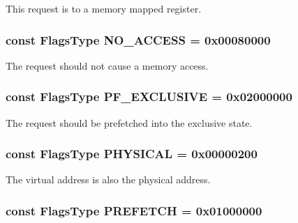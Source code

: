 \label{classRequest_a49ba1ff56158133aba02dce7a13952cb}
This request is to a memory mapped register. \hypertarget{classRequest_ab305c2952b5ae966870f325f2bef006c}{
\subsubsection[{NO\_\-ACCESS}]{\setlength{\rightskip}{0pt plus 5cm}const {\bf FlagsType} {\bf NO\_\-ACCESS} = 0x00080000}}
\label{classRequest_ab305c2952b5ae966870f325f2bef006c}
The request should not cause a memory access. \hypertarget{classRequest_ac84dc044b65651320e9fe1087e110ddc}{
\subsubsection[{PF\_\-EXCLUSIVE}]{\setlength{\rightskip}{0pt plus 5cm}const {\bf FlagsType} {\bf PF\_\-EXCLUSIVE} = 0x02000000}}
\label{classRequest_ac84dc044b65651320e9fe1087e110ddc}
The request should be prefetched into the exclusive state. \hypertarget{classRequest_a9c0b7f9771f5173e1f4a7443e785c99c}{
\subsubsection[{PHYSICAL}]{\setlength{\rightskip}{0pt plus 5cm}const {\bf FlagsType} {\bf PHYSICAL} = 0x00000200}}
\label{classRequest_a9c0b7f9771f5173e1f4a7443e785c99c}
The virtual address is also the physical address. \hypertarget{classRequest_a493dbbff4fa5325d5492ccd772bb47be}{
\subsubsection[{PREFETCH}]{\setlength{\rightskip}{0pt plus 5cm}const {\bf FlagsType} {\bf PREFETCH} = 0x01000000}}
\label{classRequest_a493dbbff4fa5325d5492ccd772bb47be}
